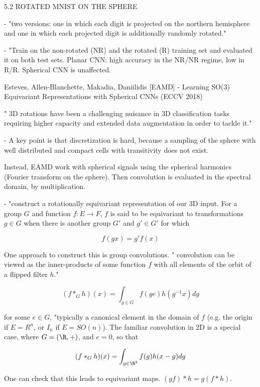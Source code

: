\documentclass[english]{article}
\begin{document}
\item 5.2 ROTATED MNIST ON THE SPHERE

- "two versions: one  in which each digit is projected on the northern hemisphere and one in
which each projected digit is additionally randomly rotated."

- "Train on the non-rotated (NR) and the rotated (R) training set and evaluated it on both test sets. Planar CNN: high accuracy in the NR/NR regime, low in R/R. Spherical CNN is unaffected.


\eenum

\item Esteves, Allen-Blanchette, Makadia, Daniilidis [EAMD]  - Learning SO(3) Equivariant Representations
with Spherical CNNs (ECCV 2018)

\benum 
\item 
" 3D rotations have been a challenging nuisance in 3D classification tasks requiring higher capacity and extended
data augmentation in order to tackle it."

- A key point is that discretization is hard, because a sampling of the sphere with well distributed and compact cells with transitivity does not exist. 

\item Instead, EAMD work with spherical signals using the spherical harmonics (Fourier transform on the sphere). Then convolution is evaluated in the spectral domain, by multiplication. 

-  "construct a rotationally equivariant representation of our 3D input. For a group $G$ and
function $f : E \to F$, $f$ is said to be equivariant to transformations $g \in G$ when there is another group $G'$ and $g'\in G'$ for which

$$f(gx) = g'f(x)$$

\item One approach to construct this is group convolutions. " convolution can be viewed as the inner-products of
some function $f$ with all elements of the orbit of a flipped filter $h$." 

$$(f *_G h)(x) = \int_{g\in G} f(ge)h(g^{-1}x)dg$$

for some $e\in G$, "typically a canonical element in the domain of $f$ (e.g. the origin if $E = R^n$, or $I_n$ if $E = SO(n)$). The familiar convolution in 2D is a special case, where $G = (\R,+)$, and $e = 0$, so that 

$$(f *_G h)(x) = \int_{g\in \R^2} f(g)h(x-g)dg$$

One can check that this leads to equivariant maps. $(gf)*h=g(f*h)$.
\end{document}
